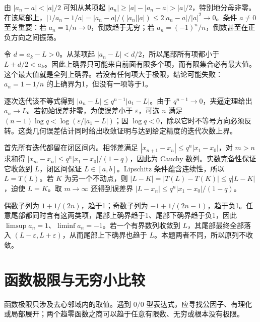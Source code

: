\documentclass[12pt,fontset=fandol]{ctexart}
\begin{document}
\begin{solve}\label{ans:c2q16}
由 $|a_n-a|<|a|/2$ 可知从某项起 $|a_n|\ge|a|-|a_n-a|>|a|/2$，特别地分母非零。在该尾部上，$|1/a_n-1/a|=|a_n-a|/(|a_n||a|)\le2|a_n-a|/|a|^2\to0$。条件 $a\ne0$ 至关重要：若 $a_n=1/n\to0$，倒数趋于无穷；若 $a_n=(-1)^n/n$，倒数甚至在正负方向之间振荡。
\end{solve}

\begin{solve}\label{ans:c2q17}
令 $d=a_k-L>0$。从某项起 $|a_n-L|<d/2$，所以尾部所有项都小于 $L+d/2<a_k$。因此上确界只可能来自前面有限多个项，而有限集合必有最大值。这个最大值就是全列上确界。若没有任何项大于极限，结论可能失败：$a_n=1-1/n$ 的上确界为1，但没有一项等于1。
\end{solve}

\begin{solve}\label{ans:c2q18}
逐次迭代该不等式得到 $|a_n-L|\le q^{n-1}|a_1-L|$。由于 $q^{n-1}\to0$，夹逼定理给出 $a_n\to L$。若初始误差非零，为使误差小于 $\varepsilon$，可选 $n$ 满足 $(n-1)\log q<\log(\varepsilon/|a_1-L|)$；因 $\log q<0$，除以它时不等号方向必须反转。这类几何误差估计同时给出收敛证明与达到给定精度的迭代次数上界。
\end{solve}

\begin{solve}\label{ans:c2q19}
首先所有迭代都留在闭区间内。相邻差满足 $|x_{n+1}-x_n|\le q^n|x_1-x_0|$，对 $m>n$ 求和得 $|x_m-x_n|\le q^n|x_1-x_0|/(1-q)$，因此为 Cauchy 数列。实数完备性保证它收敛到 $L$，闭区间保证 $L\in[a,b]$。Lipschitz 条件蕴含连续性，所以 $L=T(L)$。若 $K$ 为另一个不动点，则 $|L-K|=|T(L)-T(K)|\le q|L-K|$，迫使 $L=K$。取 $m\to\infty$ 还得到误差界 $|L-x_n|\le q^n|x_1-x_0|/(1-q)$。
\end{solve}

\begin{solve}\label{ans:c2q20}
偶数子列为 $1+1/(2n)$，趋于1；奇数子列为 $-1+1/(2n-1)$，趋于负1。任意尾部都同时含有这两类项，尾部上确界趋于1、尾部下确界趋于负1，因此 $\limsup a_n=1$、$\liminf a_n=-1$。若一个有界数列收敛到 $L$，其尾部最终全部落入 $(L-\varepsilon,L+\varepsilon)$，从而尾部上下确界也趋于 $L$。本题两者不同，所以原列不收敛。
\end{solve}

\clearpage
\section{函数极限与无穷小比较}\label{sec:ch3}
函数极限只涉及去心邻域内的取值。遇到 $0/0$ 型表达式，应寻找公因子、有理化或局部展开；两个趋零函数之商可以趋于任意有限数、无穷或根本没有极限。
\end{document}
